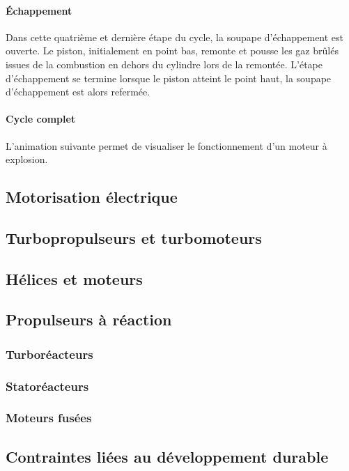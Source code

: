 		
		\paragraph{Échappement}
		
		Dans cette quatrième et dernière étape du cycle, la soupape d'échappement est ouverte. Le piston, initialement en point bas, remonte et pousse les gaz brûlés issues de la combustion en dehors du cylindre lors de la remontée. L'étape d'échappement se termine lorsque le piston atteint le point haut, la soupape d'échappement est alors refermée.
		
		\begin{figure}[H]
  		\centering
		
		\end{figure}	
		
		\paragraph{Cycle complet}
		
		L'animation suivante permet de visualiser le fonctionnement d'un moteur à explosion.	
		
		\renewcommand{\echelleTikz}{0.5}
		\begin{figure}[H]
  		\centering
		
		\end{figure}	
	
	
	\subsection{Motorisation électrique}
	
	\subsection{Turbopropulseurs et turbomoteurs}
	
	\subsection{Hélices et moteurs}
	
	\subsection{Propulseurs à réaction}
		\subsubsection{Turboréacteurs}
	
		\subsubsection{Statoréacteurs}
	
		\subsubsection{Moteurs fusées}
		
	\subsection{Contraintes liées au développement durable}
